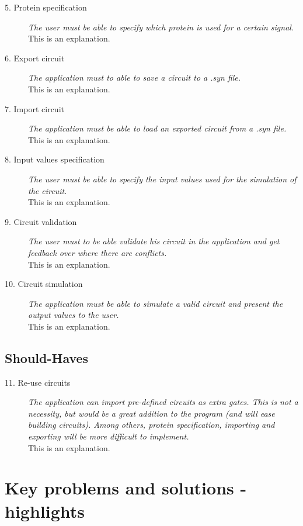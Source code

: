 \documentclass[a4paper]{article}
\begin{document}
\begin{description}
\item[5. Protein specification] \textit{The user must be able to specify which protein is used for a certain signal.}\\
This is an explanation.

\item[6. Export circuit] \textit{The application must to able to save a circuit to a .syn file.}\\
This is an explanation.

\item[7. Import circuit] \textit{The application must be able to load an exported circuit from a .syn file.}\\
This is an explanation.

\item[8. Input values specification] \textit{The user must be able to specify the input values used for the simulation of the circuit.}\\
This is an explanation.

\item[9. Circuit validation] \textit{The user must to be able validate his circuit in the application and get feedback over where there are conflicts.}\\
This is an explanation.

\item[10. Circuit simulation] \textit{The application must be able to simulate a valid circuit and present the output values to the user.}\\
This is an explanation.
\end{description}

\subsection{Should-Haves}
\begin{description}
\item[11. Re-use circuits] \textit{The application can import pre-defined circuits as extra gates. This is not a necessity, but would be a great addition to the program (and will ease building circuits). Among others, protein specification, importing and exporting will be more difficult to implement.}\\
This is an explanation.
\end{description}


\section{Key problems and solutions - highlights}
\end{document}
